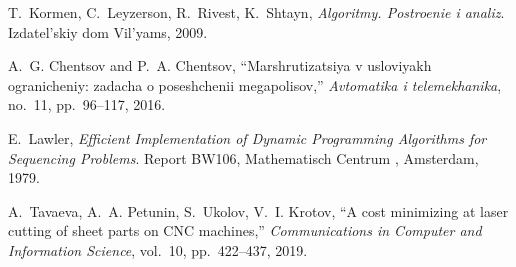 \begin{thebibliography}{10}
T.~Kormen, C.~Leyzerson, R.~Rivest, K.~Shtayn, {\em Algoritmy. Postroenie i
  analiz}.
\newblock Izdatel'skiy dom Vil'yams, 2009.

A.~G. Chentsov and P.~A. Chentsov, ``Marshrutizatsiya v usloviyakh
  ogranicheniy: zadacha o poseshchenii megapolisov,'' {\em Avtomatika i
  telemekhanika}, no.~11, pp.~96--117, 2016.

E.~Lawler, {\em Efficient Implementation of Dynamic Programming Algorithms for
  Sequencing Problems}.
\newblock Report BW106, Mathematisch Centrum , Amsterdam, 1979.

A.~Tavaeva, A.~A. Petunin, S.~Ukolov, V.~I. Krotov, ``A cost minimizing at
  laser cutting of sheet parts on {{CNC}} machines,'' {\em Communications in
  Computer and Information Science}, vol.~10, pp.~422--437, 2019.

\end{thebibliography}
